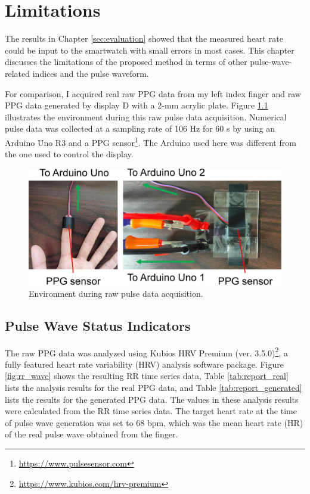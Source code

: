 \chapter{Limitations}
\label{sec:limitation}
The results in Chapter \ref{sec:evaluation} showed that the measured heart rate could be input to the smartwatch with small errors in most cases. This chapter discusses the limitations of the proposed method in terms of other pulse-wave-related indices and the pulse waveform.\par

For comparison, I acquired real raw PPG data from my left index finger and raw PPG data generated by display D with a 2-mm acrylic plate. Figure \ref{fig:raw_data_acquisition} illustrates the environment during this raw pulse data acquisition. Numerical pulse data was collected at a sampling rate of 106 Hz for 60 s by using an Arduino Uno R3 and a PPG sensor\footnote{\url{https://www.pulsesensor.com}}. The Arduino used here was different from the one used to control the display.

\begin{figure}[!t]
  \centering
  \includegraphics[width=1\linewidth]{figures/raw_data_acquisition.eps}
  \caption{Environment during raw pulse data acquisition.}
  \label{fig:raw_data_acquisition}
\end{figure}


\section{Pulse Wave Status Indicators}
The raw PPG data was analyzed using Kubios HRV Premium (ver. 3.5.0)\footnote{\url{https://www.kubios.com/hrv-premium}}, a fully featured heart rate variability (HRV) analysis software package. Figure \ref{fig:rr_wave} shows the resulting RR time series data, Table \ref{tab:report_real} lists the analysis results for the real PPG data, and Table \ref{tab:report_generated} lists the results for the generated PPG data. The values in these analysis results were calculated from the RR time series data. The target heart rate at the time of pulse wave generation was set to 68 bpm, which was the mean heart rate (HR) of the real pulse wave obtained from the finger.\par

